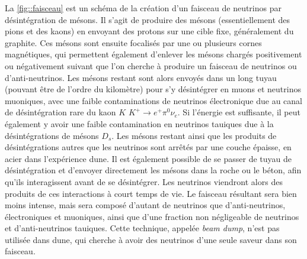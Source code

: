             
            La \autoref{fig::faisceau} est un schéma de la création d'un faisceau de neutrinos par désintégration de mésons. Il s'agit de produire des mésons (essentiellement des pions et des kaons) en envoyant des protons sur une cible fixe, généralement du graphite. Ces mésons sont ensuite focalisés par une ou plusieurs cornes magnétiques, qui permettent également d'enlever les mésons chargés positivement ou négativement suivant que l'on cherche à produire un faisceau de neutrinos ou d'anti-neutrinos. Les mésons restant sont alors envoyés dans un long tuyau (pouvant être de l'ordre du kilomètre) pour s'y désintégrer en muons et neutrinos muoniques, avec une faible contaminations de neutrinos électronique due au canal de désintégration rare du kaon $K$ $K^+ \to e^+ \pi^0 \nu_e$. Si l'énergie est suffisante, il peut également y avoir une faible contamination en neutrinos tauiques due à la désintégrations de mésons $D_s$. Les mésons restant ainsi que les produits de désintégrations autres que les neutrinos sont arrêtés par une couche épaisse, en acier dans l'expérience \gls{dune}. Il est également possible de se passer de tuyau de désintégration et d'envoyer directement les mésons dans la roche ou le béton, afin qu'ils interagissent avant de se désintégrer. Les neutrinos viendront alors des produits de ces interactions à court temps de vie. Le faisceau résultant sera bien moins intense, mais sera composé d'autant de neutrinos que d'anti-neutrinos, électroniques et muoniques, ainsi que d'une fraction non négligeable de neutrinos et d'anti-neutrinos tauiques. Cette technique, appelée \textit{beam dump}, n'est pas utilisée dans \gls{dune}, qui cherche à avoir des neutrinos d'une seule saveur dans son faisceau.
            

